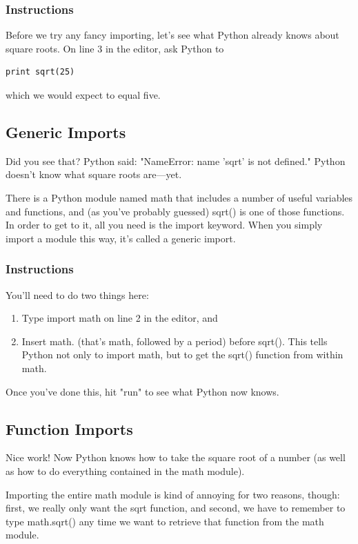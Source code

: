 \documentclass[12pt,a4paper,final,twoside,onecolumn,titlepage]{book}
\begin{document}
\subsubsection{Instructions}

Before we try any fancy importing, let's see what Python already knows about square roots. On line 3 in the editor, ask Python to
\begin{lstlisting}
print sqrt(25)
\end{lstlisting}
which we would expect to equal five.

\subsection{Generic Imports}

Did you see that? Python said: "NameError: name 'sqrt' is not defined." Python doesn't know what square roots are—yet.

There is a Python module named math that includes a number of useful variables and functions, and (as you've probably guessed) sqrt() is one of those functions. In order to get to it, all you need is the import keyword. When you simply import a module this way, it's called a generic import.

\subsubsection{Instructions}

You'll need to do two things here:
\begin{enumerate}
\item    Type import math on line 2 in the editor, and
\item    Insert math. (that's math, followed by a period) before sqrt(). This tells Python not only to import math, but to get the sqrt() function from within math.
\end{enumerate}
Once you've done this, hit "run" to see what Python now knows.

\subsection{Function Imports}

Nice work! Now Python knows how to take the square root of a number (as well as how to do everything contained in the math module).

Importing the entire math module is kind of annoying for two reasons, though: first, we really only want the sqrt function, and second, we have to remember to type math.sqrt() any time we want to retrieve that function from the math module.
\end{document}
